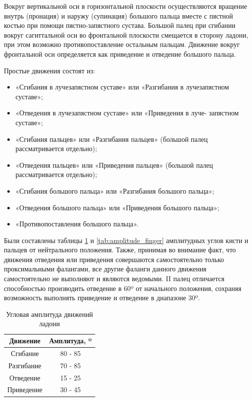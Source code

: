 \hspace{0.6cm}Вокруг вертикальной оси в горизонтальной плоскости осуществляются вращение внутрь (пронация) и наружу (супинация) большого пальца вместе с пястной костью при помощи пястно-запястного сустава. Большой палец при сгибании вокруг сагиттальной оси во фронтальной плоскости смещается в сторону ладони, при этом возможно противопоставление остальным пальцам. Движение вокруг фронтальной оси определяется как приведение и отведение большого пальца.

\newpage

Простые движения состоят из:
\begin{itemize}
	\item «Сгибания в лучезапястном суставе» или «Разгибания в лучезапястном суставе»; 
	\item «Отведения в лучезапястном суставе» или «Приведения в луче-
запястном суставе»;  
	\item «Сгибания пальцев» или «Разгибания пальцев»  (большой палец 
рассматривается отдельно); 
	\item «Отведения пальцев» или «Приведения пальцев» (большой палец рассматривается отдельно); 
	\item «Сгибания большого пальца» или «Разгибания большого пальца»; 
	\item «Отведения большого пальца» или «Приведения большого пальца»; 
	\item «Противопоставления большого пальца». 
\end{itemize}

\hspace{0.6cm}Были составлены таблицы \ref{tab:amplitude_palm} и \ref{tab:amplitude_finger} амплитудных углов кисти и пальцев от нейтрального положения. Также, принимая во внимание факт, что движения отведения или приведения совершаются самостоятельно только проксимальными фалангами, все другие фаланги данного движения самостоятельно не выполняют и являются ведомыми. II палец отличается способностью производить отведение в 60º от начального положения, сохраняя возможность выполнять приведение и отведение в диапазоне 30º.

\begin{table}[ht!]
	\caption{Угловая амплитуда движений ладони}
	\label{tab:amplitude_palm}
	\begin{center}
		\begin{tabular}{|c|c|}
			\hline
			\bf{Движение} & \bf{Амплитуда, º}\\\hline
			Сгибание & 80 - 85\\\hline
			Разгибание & 70 - 85\\\hline
			Отведение & 15 - 25\\\hline
			Приведение & 30 - 45\\\hline
		\end{tabular}
	\end{center}
\end{table}

